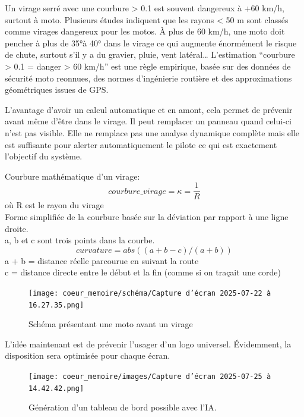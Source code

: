 Un virage serré avec une courbure > 0.1 est souvent dangereux à +60 km/h, surtout à moto.
Plusieurs études indiquent que les rayons < 50 m sont classés comme virages dangereux pour les motos. À plus de 60 km/h, une moto doit pencher à plus de 35°à 40° dans le virage ce qui augmente énormément le risque de chute, surtout s’il y a du gravier, pluie, vent latéral…
L’estimation “courbure > 0.1 = danger > 60 km/h” est une règle empirique, basée sur des données de sécurité moto reonnues, des normes d'ingénierie routière et des approximations géométriques issues de GPS.


L'avantage d'avoir un calcul automatique et en amont, cela permet de prévenir avant même d'être dans le virage. Il peut remplacer un panneau quand celui-ci n'est pas visible. Elle ne remplace pas une analyse dynamique complète mais elle est suffisante pour alerter automatiquement le pilote ce qui est exactement l’objectif du système.



\begin{tcolorbox}[title=Calcul de la courbure]
Courbure mathématique\cite{formule_curvature} d’un virage:
\[
courbure\_virage = \kappa = \frac{1}{R}
\]
où R est le rayon du virage\\
Forme simplifiée de la courbure basée sur la déviation par rapport à une ligne droite.\\
a, b et c sont trois points dans la courbe.\\
\[
curvature = abs((a + b - c) / (a + b))
\]
a + b = distance réelle parcourue en suivant la route \\
c = distance directe entre le début et la fin (comme si on traçait une corde)
\end{tcolorbox}

\begin{figure}[H]
    \centering
    \texttt{[image: coeur\_memoire/schéma/Capture d’écran 2025-07-22 à 16.27.35.png]} 
    \caption{Schéma présentant une moto avant un virage}
\end{figure}






L'idée maintenant est de prévenir l'usager d'un logo universel. Évidemment, la disposition sera optimisée pour chaque écran. 
\begin{figure}[H]
    \centering
    \texttt{[image: coeur\_memoire/images/Capture d’écran 2025-07-25 à 14.42.42.png]} 
    \caption{Génération d'un tableau de bord possible avec l'IA.}
\end{figure}

